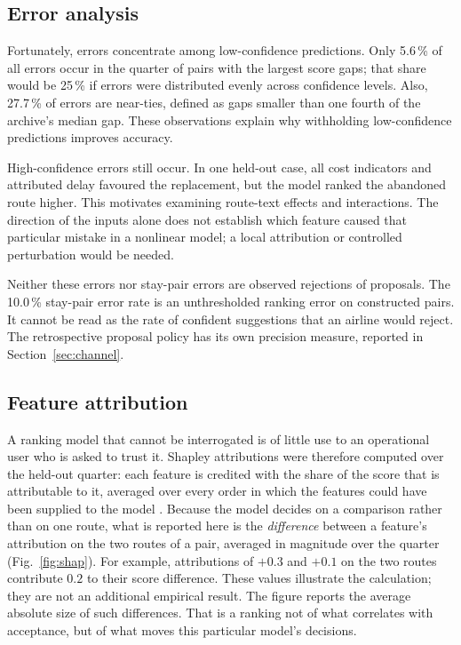 \documentclass[preprint,authoryear,12pt]{elsarticle}
\begin{document}
\subsection{Error analysis}

Fortunately, errors concentrate among low-confidence predictions. Only 5.6\,\%
of all errors occur in the quarter of pairs with the largest score
gaps; that share would be 25\,\% if errors were distributed evenly
across confidence levels. Also, 27.7\,\% of errors are near-ties,
defined as gaps smaller than one fourth of the archive's median gap.
These observations explain why withholding low-confidence predictions
improves accuracy.

High-confidence errors still occur. In one held-out case, all cost
indicators and attributed delay favoured the replacement, but the model
ranked the abandoned route higher. This motivates examining route-text
effects and interactions. The direction of the inputs alone does not
establish which feature caused that particular mistake in a nonlinear
model; a local attribution or controlled perturbation would be needed.

Neither these errors nor stay-pair errors are observed rejections of
proposals. The 10.0\,\% stay-pair error rate is an unthresholded
ranking error on constructed pairs. It cannot be read as the rate of
confident suggestions that an airline would reject. The retrospective
proposal policy has its own precision measure, reported in
Section~\ref{sec:channel}.

\subsection{Feature attribution}
\label{sec:weigh}

A ranking model that cannot be interrogated is of little use to an
operational user who is asked to trust it. Shapley attributions were
therefore computed over the held-out quarter: each feature is credited
with the share of the score that is attributable to it, averaged over
every order in which the features could have been supplied to the model
\citep{lundberg2017}. Because the model decides on a comparison rather
than on one route, what is reported here is the \emph{difference}
between a feature's attribution on the two routes of a pair, averaged
in magnitude over the quarter (Fig.~\ref{fig:shap}). For example,
attributions of $+0.3$ and $+0.1$ on the two routes contribute $0.2$ to
their score difference. These values illustrate the calculation; they
are not an additional empirical result. The figure reports the average
absolute size of such differences. That is a ranking
not of what correlates with acceptance, but of what moves this
particular model's decisions.
\end{document}
